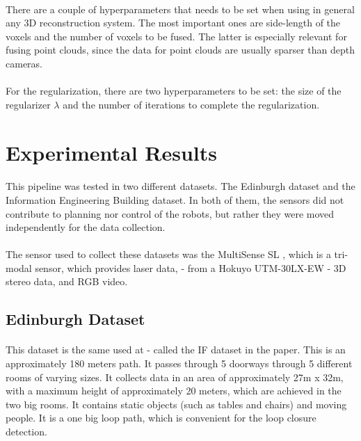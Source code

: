 \documentclass[12pt]{article}
\begin{document}
	\paragraph{}
	There are a couple of hyperparameters that needs to be set when using in general any 3D reconstruction system. The most important ones are side-length of the voxels and the number of voxels to be fused. The latter is especially relevant for fusing point clouds, since the data for point clouds are usually sparser than depth cameras.
	
	\paragraph{}
	For the regularization, there are two  hyperparameters to be set: the size of the regularizer $\lambda$ and the number of iterations to complete the regularization. 
		
	
	\newpage
	\section{Experimental Results}
	\label{subs:experiments}
	\paragraph{}
	This pipeline was tested in two different datasets. The Edinburgh dataset and the Information Engineering Building dataset. In both of them, the sensors did not contribute to planning nor control of the robots, but rather they were moved independently for the data collection.
	
	\paragraph{}
	The sensor used to collect these datasets was the MultiSense SL \cite{multisense}, which is a tri-modal sensor, which provides laser data, - from a Hokuyo UTM-30LX-EW - 3D stereo data, and RGB video. 
	
	\subsection{Edinburgh Dataset}
	\paragraph{}
	This dataset is the same used at \cite{AICPAlign} - called the IF dataset in the paper. This is an approximately 180 meters path. It passes through 5 doorways through 5 different rooms of varying sizes. It collects data in an area of approximately 27m x 32m, with a maximum height of approximately 20 meters, which are achieved in the two big rooms. It contains static objects (such as tables and chairs) and moving people. It is a one big loop path, which is convenient for the loop closure detection.
	
\end{document}
